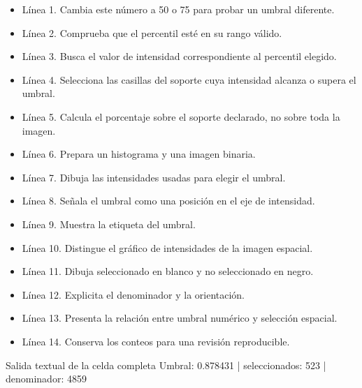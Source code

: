 \begin{itemize}

\item Línea 1. Cambia este número a 50 o 75 para probar un umbral diferente.

\item Línea 2. Comprueba que el percentil esté en su rango válido.

\item Línea 3. Busca el valor de intensidad correspondiente al percentil elegido.

\item Línea 4. Selecciona las casillas del soporte cuya intensidad alcanza o supera el umbral.

\item Línea 5. Calcula el porcentaje sobre el soporte declarado, no sobre toda la imagen.

\item Línea 6. Prepara un histograma y una imagen binaria.

\item Línea 7. Dibuja las intensidades usadas para elegir el umbral.

\item Línea 8. Señala el umbral como una posición en el eje de intensidad.

\item Línea 9. Muestra la etiqueta del umbral.

\item Línea 10. Distingue el gráfico de intensidades de la imagen espacial.

\item Línea 11. Dibuja seleccionado en blanco y no seleccionado en negro.

\item Línea 12. Explicita el denominador y la orientación.

\item Línea 13. Presenta la relación entre umbral numérico y selección espacial.

\item Línea 14. Conserva los conteos para una revisión reproducible.

\end{itemize}

\begin{Salida}{Salida textual de la celda completa}
Umbral: 0.878431 | seleccionados: 523 | denominador: 4859
\end{Salida}


